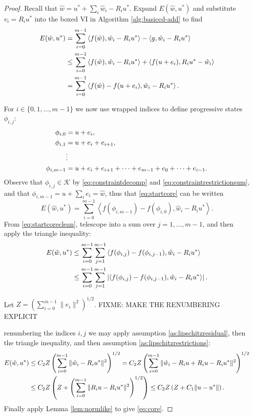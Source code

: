 \documentclass[letterpaper,final,12pt,reqno]{amsart}
\theoremstyle{cstyle}
\theoremstyle{cstyle*}
\theoremstyle{dstyle}
\numberwithin{equation}{section}
\numberwithin{figure}{section}
\numberwithin{table}{section}
\numberwithin{theorem}{section}
\newcommand{\cK}{\mathcal{K}}
\newcommand{\ip}[2]{\left<#1,#2\right>}
\begin{document}
\begin{proof}  Recall that $\hat w = u^* + \sum_i \hat w_i - R_i u^*$.  Expand $E(\hat w,u^*)$ and substitute $v_i = R_i u^*$ into the boxed VI in Algorithm \ref{alg:basiccd-add} to find
\begin{align}
E(\hat w,u^*) &= \sum_{i=0}^{m-1} \ip{f(\hat w)}{\hat w_i - R_i u^*} - \ip{g}{\hat w_i - R_i u^*} \label{eq:startcore} \\
    &\le \sum_{i=0}^{m-1} \ip{f(\hat w)}{\hat w_i - R_i u^*} + \ip{f(u + e_i)}{R_i u^* - \hat w_i} \notag \\
    &= \sum_{i=0}^{m-1} \ip{f(\hat w) - f(u + e_i)}{\hat w_i - R_i u^*}. \notag
\end{align}

For $i\in \{0,1,\dots,m-1\}$ we now use wrapped indices to define progressive states $\phi_{i,j}$:
\begin{align}
\phi_{i,0} &= u + e_i, \label{eq:gridcore} \\
\phi_{i,1} &= u + e_i + e_{i+1}, \notag \\
  &\vdots \notag \\
\phi_{i,m-1} &= u + e_i + e_{i+1} + \dots + e_{m-1} + e_0 + \dots + e_{i-1}. \notag
\end{align}
Observe that $\phi_{i,j} \in \cK$ by \eqref{eq:constraintdecomp} and \eqref{eq:constraintrestrictionsum}, and that $\phi_{i,m-1} = u + \sum_i e_i = \hat w$, thus that \eqref{eq:startcore} can be written
\begin{equation}
E(\hat w,u^*) = \sum_{i=0}^{m-1} \ip{f(\phi_{i,m-1}) - f(\phi_{i,0})}{\hat w_i - R_i u^*}. \label{eq:startcoreclean}
\end{equation}
From \eqref{eq:startcoreclean}, telescope into a sum over $j=1,\dots,m-1$, and then apply the triangle inequality:
\begin{align}
E(\hat w,u^*) &\le \sum_{i=0}^{m-1} \sum_{j=1}^{m-1} \ip{f(\phi_{i,j}) - f(\phi_{i,j-1})}{\hat w_i - R_i u^*} \label{eq:nextcore} \\
  &\le \sum_{i=0}^{m-1} \sum_{j=1}^{m-1} \left|\ip{f(\phi_{i,j}) - f(\phi_{i,j-1})}{\hat w_i - R_i u^*}\right|. \notag
\end{align}

Let $Z=\left(\sum_{i=0}^{m-1} \|e_i\|^2\right)^{1/2}$.  FIXME: MAKE THE RENUMBERING EXPLICIT

renumbering the indices $i,j$ we may apply assumption \eqref{as:lipschitzresidual}, then the triangle inequality, and then assumption \eqref{as:lipschitzrestrictions}:
\begin{align}
E(\hat w,u^*) &\le C_2 Z \left(\sum_{i=0}^{m-1} \|\hat w_i - R_i u^*\|^2\right)^{1/2} = C_2 Z \left(\sum_{i=0}^{m-1} \|\hat w_i - R_i u + R_i u - R_i u^*\|^2\right)^{1/2} \label{eq:nextnextcore} \\
  &\le C_2 Z \left(Z + \left(\sum_{i=0}^{m-1} \|R_i u - R_i u^*\|^2\right)^{1/2}\right) \le C_2 Z \left(Z + C_1 \|u-u^*\|\right). \notag
\end{align}
Finally apply Lemma \ref{lem:normlike} to give \eqref{eq:core}.
\end{proof}
\end{document}
